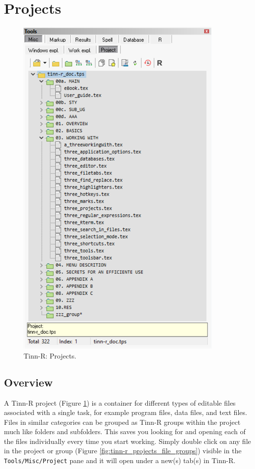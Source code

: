 
\hypertarget{working_projects}{}
\section{Projects}

\begin{figure}[H]
  \begin{center}
    \includegraphics[scale=0.60]{./res/tools_misc_project.png}
  \end{center}
  \caption{Tinn-R: Projects.}
  \label{fig:tinn-r_projects}
\end{figure}

\subsection{Overview}
A Tinn-R project (Figure \ref{fig:tinn-r_projects}) is a container for different types of editable 
files associated with a single task, for example program files, data files, and text files. 
Files in similar categories can be grouped as Tinn-R groups within the project much like folders and subfolders.  
This saves you looking for and opening each of the files individually every time you start working. 
Simply double click on any file in the project or group
(Figure \ref{fig:tinn-r_projects_file_groups})
visible in the \texttt{Tools/Misc/Project} pane
and it will open under a new(s) tab(s) in Tinn-R.

